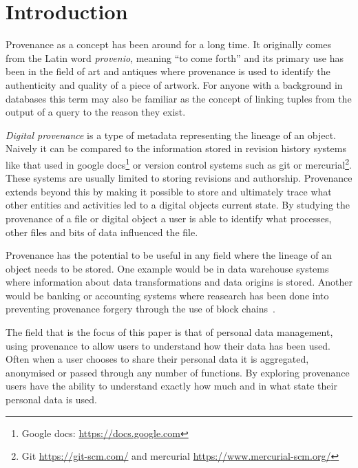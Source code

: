 \chapter{Introduction}

Provenance as a concept has been around for a long time. It originally comes from the Latin word \textit{provenio}, meaning ``to come forth'' and its primary use has been in the field of art and antiques where provenance is used to identify the authenticity and quality of a piece of artwork. For anyone with a background in databases this term may also be familiar as the concept of linking tuples from the output of a query to the reason they exist.

\textit{Digital provenance} is a type of metadata representing the lineage of an object. Naively it can be compared to the information stored in revision history systems like that used in google docs\footnote{Google docs: \url{https://docs.google.com}} or version control
systems such as git or mercurial\footnote{Git \url{https://git-scm.com/} and mercurial \url{https://www.mercurial-scm.org/}}. These systems are usually limited to storing revisions and authorship. Provenance extends beyond this by making it possible to store and ultimately trace what other entities and activities led to a digital objects current state. By studying the provenance of a file or digital object a user is able to identify what processes, other files and bits of data influenced the file.

Provenance has the potential to be useful in any field where the lineage of an object needs to be stored. One example would be in data warehouse systems where information about data transformations and data origins is stored. Another would be banking or accounting systems where reasearch has been done into preventing provenance forgery through the use of block chains~\cite{Hasan2009}.

The field that is the focus of this paper is that of personal data management, using provenance to  allow users to understand how their data has been used. Often when a user chooses to share their personal data it is aggregated, anonymised or passed through any number of functions. By exploring provenance users have the ability to understand exactly how much and in what state their personal data is used.

